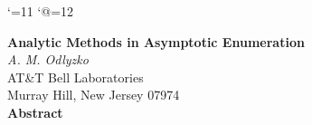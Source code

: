 

\setlength{\textwidth}{6.2in}
\setlength{\textheight}{9in}
\setlength{\oddsidemargin}{.2in}
\setlength{\topmargin}{-0.25in}
\setlength{\headheight}{0in}
\newcommand{\dd}{\ldots}
\newcommand{\hsp}{\hspace{\parindent}}
\newcommand{\tht}{\theta}
\newcommand{\af}{\alpha}
\newcommand{\be}{\beta}
\newcommand{\la}{\lambda}
\newcommand{\cd}{\cdots}
\newcommand{\mem}{\in}
\newcommand{\lt}{\left(}
\newcommand{\rt}{\right)}
\newcommand{\lf}{\lfloor}
\newcommand{\rf}{\rfloor}
\def\binom#1#2{{#1}\choose{#2}}
\newcommand{\dis}{\displaystyle}
\newcommand{\df}{\displaystyle\frac}
\newcommand{\ds}{\displaystyle\sum}
\newcommand{\In}{\infty}
\newcommand{\wg}{\sim}
\newcommand{\Tht}{\Theta}
\newcommand{\sq}{\sqrt}
\newcommand{\ep}{\epsilon}
\newcommand{\RR}{{\Bbb R}}
\newcommand{\CC}{{\Bbb C}}
\newcommand{\ZZ}{{\Bbb Z}}
\newcommand{\Om}{\Omega}
\newcommand{\beq}{\begin{equation}}
\newcommand{\beql}[1]{\begin{equation}\label{#1}}
\newcommand{\eeq}{\end{equation}}
\newcommand{\eqn}[1]{(\ref{#1})}
\newtheorem{lemma}{Lemma}[section] 
\newtheorem{prop}{Proposition}[section]
\newtheorem{theorem}{Theorem}[section]
\newtheorem{coro}{Corollary}[section]
\newtheorem{conj}{Conjecture}[section] 
\newtheorem{defn}{Definition}[section]
\newtheorem{exam}{Example}[section]
\renewcommand{\theequation}{\arabic{section}.\arabic{equation}}

\catcode`\@=11
\renewcommand{\section}{
	\setcounter{equation}{0}
	\@startsection {section}{1}{\z@}{-3.5ex plus -1ex minus
	-.2ex}{2.3ex plus .2ex}{\large\bf}
	}
\catcode`@=12
\thispagestyle{empty}

\begin{center}
{\Large {\bf Analytic Methods in Asymptotic Enumeration}} \\
\vspace{\baselineskip}
{\em A. M. Odlyzko} \\
\vspace{0.25\baselineskip}
AT\&T Bell Laboratories \\
Murray Hill, New Jersey 07974 \\
\vspace{1.5\baselineskip}
{\large {\bf Abstract}}
\vspace{1\baselineskip}
\end{center}
\setlength{\baselineskip}{1.5\baselineskip}

